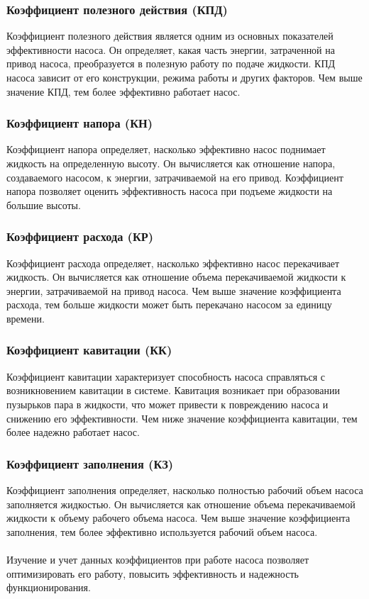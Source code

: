 \documentclass{article}
\begin{document}
\subsubsection{Коэффициент полезного действия (КПД)}
Коэффициент полезного действия является одним из основных показателей эффективности насоса. Он определяет, какая часть энергии, затраченной на привод насоса, преобразуется в полезную работу по подаче жидкости. КПД насоса зависит от его конструкции, режима работы и других факторов. Чем выше значение КПД, тем более эффективно работает насос.
\subsubsection{Коэффициент напора (КН)}
Коэффициент напора определяет, насколько эффективно насос поднимает жидкость на определенную высоту. Он вычисляется как отношение напора, создаваемого насосом, к энергии, затрачиваемой на его привод. Коэффициент напора позволяет оценить эффективность насоса при подъеме жидкости на большие высоты.
\subsubsection{Коэффициент расхода (КР)}
Коэффициент расхода определяет, насколько эффективно насос перекачивает жидкость. Он вычисляется как отношение объема перекачиваемой жидкости к энергии, затрачиваемой на привод насоса. Чем выше значение коэффициента расхода, тем больше жидкости может быть перекачано насосом за единицу времени.
\subsubsection{Коэффициент кавитации (КК)}
Коэффициент кавитации характеризует способность насоса справляться с возникновением кавитации в системе. Кавитация возникает при образовании пузырьков пара в жидкости, что может привести к повреждению насоса и снижению его эффективности. Чем ниже значение коэффициента кавитации, тем более надежно работает насос.
\subsubsection{Коэффициент заполнения (КЗ)}
Коэффициент заполнения определяет, насколько полностью рабочий объем насоса заполняется жидкостью. Он вычисляется как отношение объема перекачиваемой жидкости к объему рабочего объема насоса. Чем выше значение коэффициента заполнения, тем более эффективно используется рабочий объем насоса.\\
~\\
Изучение и учет данных коэффициентов при работе насоса позволяет оптимизировать его работу, повысить эффективность и надежность функционирования.
\end{document}
